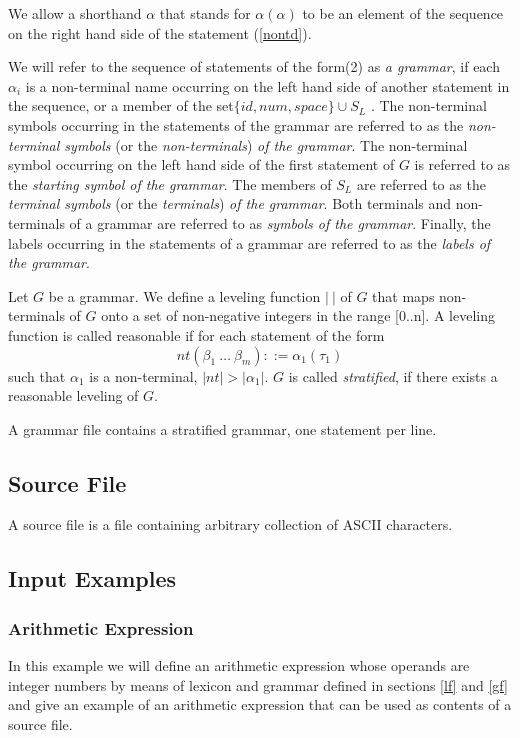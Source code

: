 \documentclass[a4paper,10pt]{article}
\begin{document}
We allow a shorthand $\alpha$ that stands for $\alpha(\alpha)$ to be an element of the sequence on the right hand side of the statement (\ref{nontd}). 


We will refer to the sequence of statements of the form(2) as \textit{a grammar}, if each $\alpha_i$ is a  non-terminal  name occurring on the left hand side of another statement in the sequence, or a member of the set$\{id, num, space\}\cup S_L$ . The non-terminal symbols occurring in the statements of the grammar are referred to as the \textit{non-terminal symbols} (or the \textit{non-terminals}) \textit{of the grammar}. 
The non-terminal symbol occurring on the left hand side of the first statement of $G$ is referred to as the \textit{starting symbol of the grammar}. The members of $S_L$ are referred to as the \textit{terminal symbols} (or the \textit{terminals}) \textit{of the grammar}.  Both terminals and non-terminals of a grammar are referred to as \textit{symbols of the grammar}. 
Finally, the labels occurring in the statements of a grammar are referred to as the \textit{labels of the grammar}.

Let $G$ be a grammar.
We define a leveling function $|\ |$ of $G$ that maps non-terminals of $G$ onto a set of non-negative integers in the range [0..n].
A leveling function is called reasonable if for each statement of the form 
$$nt(\beta_1~\ldots~\beta_m) ::= \alpha_1(\tau_1)$$
such that  $\alpha_1$ is a non-terminal, $|nt|> |\alpha_1|$.
$G$ is called \textit{stratified}, if there exists a reasonable leveling of $G$.
  
A grammar file contains a stratified grammar, one  statement per line.

\subsection{Source File}\label{sf}
A source file is a file containing arbitrary collection of ASCII characters.

\subsection{Input Examples}\label{ie}
\subsubsection{Arithmetic Expression}
In this example we will define an arithmetic expression whose operands are integer numbers  by means of lexicon and grammar defined in sections \ref{lf} and \ref{gf} and give an example of an arithmetic expression that can be used as contents of a source file.
\end{document}
